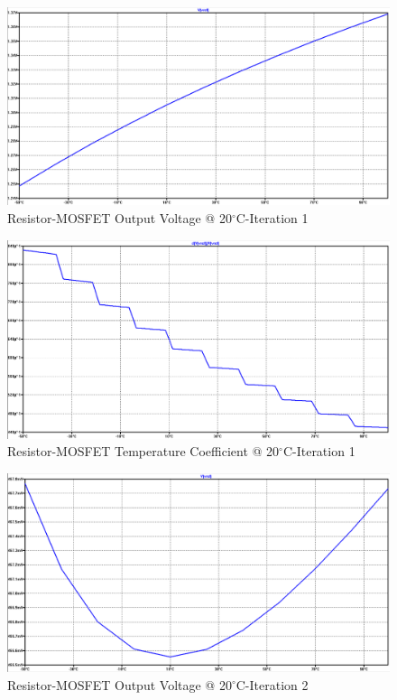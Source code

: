 \documentclass[conference]{IEEEtran}
\begin{document}
\begin{figure}[!htbp]
  	\centering
  	\includegraphics[scale=0.35]{images/appendix/mos-res1-vref.png}
  	\caption[output-z-meas]{Resistor-MOSFET Output Voltage @ 20$^{\circ}$C-Iteration 1}
  	\label{fig:mos-res1-vref}
	\end{figure}
\begin{figure}[!htbp]
  	\centering
  	\includegraphics[scale=0.35]{images/appendix/mos-res1-tempco.png}
  	\caption[output-z-meas]{Resistor-MOSFET Temperature Coefficient @ 20$^{\circ}$C-Iteration 1}
  	\label{fig:mos-res1-tempco}
	\end{figure}
\begin{figure}[!htbp]
  	\centering
  	\includegraphics[scale=0.35]{images/appendix/mos-res2-vref.png}
  	\caption[output-z-meas]{Resistor-MOSFET Output Voltage @ 20$^{\circ}$C-Iteration 2}
  	\label{fig:mos-res2-vref}
	\end{figure}
\end{document}

